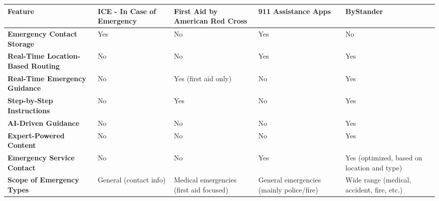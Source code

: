 \begin{table}[htp]
\tiny
\centering
\begin{tabular}{|p{2.2cm}|p{2.2cm}|p{2.2cm}|p{2.2cm}|p{2.2cm}|}
\hline
\textbf{Feature}                           & \textbf{ICE - In Case of Emergency}                     & \textbf{First Aid by American Red Cross}            & \textbf{911 Assistance Apps}                        & \textbf{ByStander}                                     \\ \hline
\textbf{Emergency Contact Storage}          & Yes                                               & No                                            & Yes                                            & No                                               \\ \hline
\textbf{Real-Time Location-Based Routing}   & No                                                & No                                            & Yes                                            & Yes                                              \\ \hline
\textbf{Real-Time Emergency Guidance}       & No                                                & Yes (first aid only)                          & No                                             & Yes                                              \\ \hline
\textbf{Step-by-Step Instructions}          & No                                                & Yes                                           & No                                             & Yes                                              \\ \hline
\textbf{AI-Driven Guidance}                 & No                                                & No                                            & No                                             & Yes                                              \\ \hline
\textbf{Expert-Powered Content}             & No                                                & No                                            & No                                             & Yes                                              \\ \hline
\textbf{Emergency Service Contact}          & No                                                & No                                            & Yes                                            & Yes (optimized, based on location and type)      \\ \hline
\textbf{Scope of Emergency Types}           & General (contact info)                            & Medical emergencies (first aid focused)       & General emergencies (mainly police/fire)       & Wide range (medical, accident, fire, etc.)       \\ \hline

\end{tabular}
\end{table}
